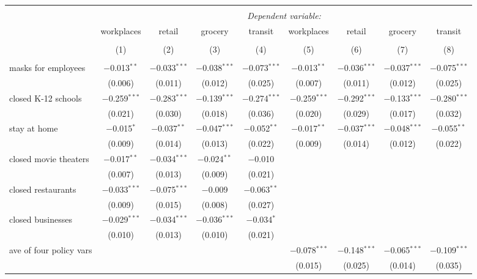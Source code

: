 \begin{tabular}{@{\extracolsep{1pt}}lcccccccc} 
\\[-1.8ex]\hline 
\hline \\[-1.8ex] 
 & \multicolumn{8}{c}{\textit{Dependent variable:}} \\ 
\cline{2-9} 
 & workplaces & retail & grocery & transit & workplaces & retail & grocery & transit \\ 
\\[-1.8ex] & (1) & (2) & (3) & (4) & (5) & (6) & (7) & (8)\\ 
\hline \\[-1.8ex] 
 masks for employees & $-$0.013$^{**}$ & $-$0.033$^{***}$ & $-$0.038$^{***}$ & $-$0.073$^{***}$ & $-$0.013$^{**}$ & $-$0.036$^{***}$ & $-$0.037$^{***}$ & $-$0.075$^{***}$ \\ 
  & (0.006) & (0.011) & (0.012) & (0.025) & (0.007) & (0.011) & (0.012) & (0.025) \\ 
  closed K-12 schools & $-$0.259$^{***}$ & $-$0.283$^{***}$ & $-$0.139$^{***}$ & $-$0.274$^{***}$ & $-$0.259$^{***}$ & $-$0.292$^{***}$ & $-$0.133$^{***}$ & $-$0.280$^{***}$ \\ 
  & (0.021) & (0.030) & (0.018) & (0.036) & (0.020) & (0.029) & (0.017) & (0.032) \\ 
  stay at home & $-$0.015$^{*}$ & $-$0.037$^{**}$ & $-$0.047$^{***}$ & $-$0.052$^{**}$ & $-$0.017$^{**}$ & $-$0.037$^{***}$ & $-$0.048$^{***}$ & $-$0.055$^{**}$ \\ 
  & (0.009) & (0.014) & (0.013) & (0.022) & (0.009) & (0.014) & (0.012) & (0.022) \\ 
  closed movie theaters & $-$0.017$^{**}$ & $-$0.034$^{***}$ & $-$0.024$^{**}$ & $-$0.010 &  &  &  &  \\ 
  & (0.007) & (0.013) & (0.009) & (0.021) &  &  &  &  \\ 
  closed restaurants & $-$0.033$^{***}$ & $-$0.075$^{***}$ & $-$0.009 & $-$0.063$^{**}$ &  &  &  &  \\ 
  & (0.009) & (0.015) & (0.008) & (0.027) &  &  &  &  \\ 
  closed businesses & $-$0.029$^{***}$ & $-$0.034$^{***}$ & $-$0.036$^{***}$ & $-$0.034$^{*}$ &  &  &  &  \\ 
  & (0.010) & (0.013) & (0.010) & (0.021) &  &  &  &  \\ 
  ave of four policy vars &  &  &  &  & $-$0.078$^{***}$ & $-$0.148$^{***}$ & $-$0.065$^{***}$ & $-$0.109$^{***}$ \\ 
  &  &  &  &  & (0.015) & (0.025) & (0.014) & (0.035) \\ 

\end{tabular}

